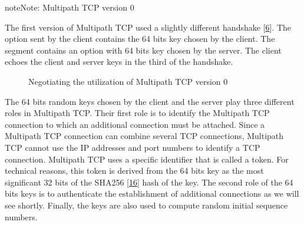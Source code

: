 \documentclass[letterpaper,10pt,english]{sphinxmanual}
\begin{document}
\begin{sphinxadmonition}{note}{Note:}
\sphinxAtStartPar
Multipath TCP version 0

\sphinxAtStartPar
The first version of Multipath TCP used a slightly different handshake {[}\hyperlink{cite.biblio:id6658}{6}{]}. The  option sent by the client contains the 64 bits key chosen by the client. The  segment contains an  option with 64 bits key chosen by the server. The client echoes the client and server keys in the third  of the handshake.
\begin{figure}[H]\centering\capstart{}\caption{Negotiating the utilization of Multipath TCP version 0}\label{\detokenize{mptcp:id64}}\label{\detokenize{mptcp:fig-tcp-handshake-mptcp-v0}}\end{figure}\end{sphinxadmonition}

\sphinxAtStartPar
The 64 bits random keys chosen by the client and the server play three different roles in Multipath TCP. Their first role is to identify the Multipath TCP connection to which an additional connection must be attached. Since a Multipath TCP connection can combine several TCP connections, Multipath TCP cannot use the IP addresses and port numbers to identify a TCP connection. Multipath TCP uses a specific identifier that is called a token. For technical reasons, this token is derived from the 64 bits key as the most significant 32 bits of the SHA\sphinxhyphen{}256 {[}\hyperlink{cite.biblio:id6083}{16}{]} hash of the key. The second role of the 64 bits keys is to authenticate the establishment of additional connections as we will see shortly. Finally, the keys are also used to compute random initial sequence numbers.
\end{document}
